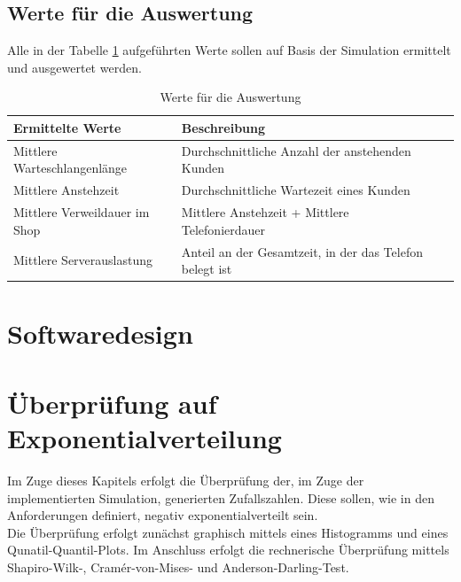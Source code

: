 \subsection{Werte für die Auswertung}
Alle in der Tabelle \ref{tab:WerteAuswertung} aufgeführten Werte sollen auf Basis der Simulation ermittelt und ausgewertet werden.
\begin{table}[htpb]
	\centering
	\begin{tabular}{lll}
		Ermittelte Werte & Beschreibung \\ \hline
		Mittlere Warteschlangenlänge & Durchschnittliche Anzahl der anstehenden Kunden \\
		Mittlere Anstehzeit & Durchschnittliche Wartezeit eines Kunden \\
		Mittlere Verweildauer im Shop & Mittlere Anstehzeit + Mittlere Telefonierdauer\\
		Mittlere Serverauslastung & Anteil an der Gesamtzeit, in der das Telefon belegt ist\\
	\end{tabular}
	\caption{Werte für die Auswertung}
	\label{tab:WerteAuswertung}
\end{table}


\section{Softwaredesign}

\section{Überprüfung auf Exponentialverteilung}
Im Zuge dieses Kapitels erfolgt die Überprüfung der, im Zuge der implementierten Simulation, generierten Zufallszahlen. Diese sollen, wie in den Anforderungen definiert, negativ exponentialverteilt sein. \\
Die Überprüfung erfolgt zunächst graphisch mittels eines Histogramms und eines Qunatil-Quantil-Plots. Im Anschluss erfolgt die rechnerische Überprüfung mittels Shapiro-Wilk-, Cramér-von-Mises- und Anderson-Darling-Test.

